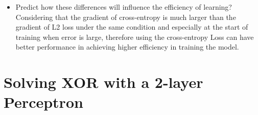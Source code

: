 \documentclass{article}
\begin{document}
\begin{enumerate}
\begin{itemize}
        	
        	\item
        	Predict how these differences will influence the efficiency of learning?\\
        	Considering that the gradient of cross-entropy is much larger than the gradient of L2 loss under the same condition and especially at the start of training when error is large, therefore using the cross-entropy Loss can have better performance in achieving higher efficiency in training the model.\\

        \end{itemize}
    	
    \end{enumerate} 
    
    
    \section{Solving XOR with a 2-layer Perceptron}
    \noindent
\end{document}

